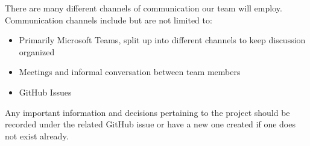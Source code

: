 There are many different channels of communication our team will employ. Communication channels include but are not limited to:
\begin{itemize}
	\item Primarily Microsoft Teams, split up into different channels to keep discussion organized
	\item Meetings and informal conversation between team members
	\item GitHub Issues
\end{itemize}
Any important information and decisions pertaining to the project should be recorded under the related GitHub issue or have a new one created if one does not exist already.